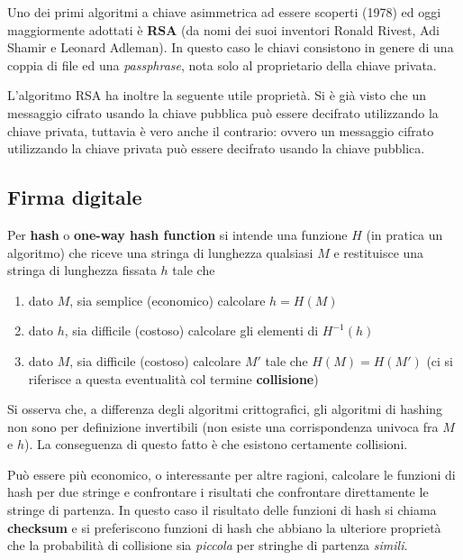 \documentclass[italian,]{article}
\providecommand{\tightlist}{%
  \setlength{\itemsep}{0pt}\setlength{\parskip}{0pt}}
\begin{document}
Uno dei primi algoritmi a chiave asimmetrica ad essere scoperti (1978)
ed oggi maggiormente adottati è \textbf{RSA} (da nomi dei suoi inventori
Ronald Rivest, Adi Shamir e Leonard Adleman). In questo caso le chiavi
consistono in genere di una coppia di file ed una \emph{passphrase},
nota solo al proprietario della chiave privata.

L'algoritmo RSA ha inoltre la seguente utile proprietà. Si è già visto
che un messaggio cifrato usando la chiave pubblica può essere decifrato
utilizzando la chiave privata, tuttavia è vero anche il contrario:
ovvero un messaggio cifrato utilizzando la chiave privata può essere
decifrato usando la chiave pubblica.

\subsection{Firma digitale}\label{firma-digitale}

Per \textbf{hash} o \textbf{one-way hash function} si intende una
funzione \(H\) (in pratica un algoritmo) che riceve una stringa di
lunghezza qualsiasi \(M\) e restituisce una stringa di lunghezza fissata
\(h\) tale che

\begin{enumerate}
\def\labelenumi{\arabic{enumi}.}
\tightlist
\item
  dato \(M\), sia semplice (economico) calcolare \(h = H(M)\)
\item
  dato \(h\), sia difficile (costoso) calcolare gli elementi di
  \(H^{-1}(h)\)
\item
  dato \(M\), sia difficile (costoso) calcolare \(M'\) tale che
  \(H(M) = H(M')\) (ci si riferisce a questa eventualità col termine
  \textbf{collisione})
\end{enumerate}

Si osserva che, a differenza degli algoritmi crittografici, gli
algoritmi di hashing non sono per definizione invertibili (non esiste
una corrispondenza univoca fra \(M\) e \(h\)). La conseguenza di questo
fatto è che esistono certamente collisioni.

Può essere più economico, o interessante per altre ragioni, calcolare le
funzioni di hash per due stringe e confrontare i risultati che
confrontare direttamente le stringe di partenza. In questo caso il
risultato delle funzioni di hash si chiama \textbf{checksum} e si
preferiscono funzioni di hash che abbiano la ulteriore proprietà che la
probabilità di collisione sia \emph{piccola} per stringhe di partenza
\emph{simili}.
\end{document}
